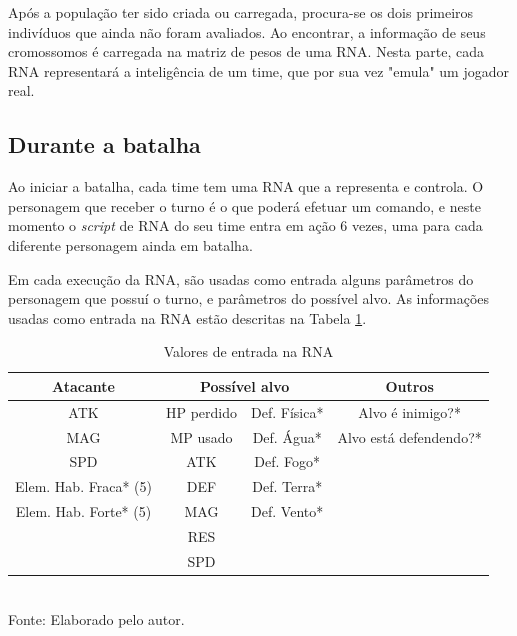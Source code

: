 \documentclass[
	12pt,					%
	openright,				%
	oneside,				%
	a4paper,				%
	bibjustif,				%
	chapter=TITLE,			%
	english,				%
	brazil,					%
	]{abntex2}
\newcommand{\source}[1]{\small Fonte: {#1}}
\begin{document}
	Após a população ter sido criada ou carregada,
	procura-se os dois primeiros indivíduos que ainda não foram avaliados.
	Ao encontrar, a informação de seus cromossomos é carregada na matriz de pesos de uma RNA.
	Nesta parte, cada RNA representará a inteligência de um time,
	que por sua vez "emula"{} um jogador real.
	
	\subsection{Durante a batalha}
	Ao iniciar a batalha, cada time tem uma RNA que a representa e controla.
	O personagem que receber o turno é o que poderá efetuar um comando,
	e neste momento o \textit{script} de RNA do seu time entra em ação 6 vezes,
	uma para cada diferente personagem ainda em batalha.
	
	Em cada execução da RNA, são usadas como entrada alguns parâmetros do personagem que possuí o turno,
	e parâmetros do possível alvo.
	As informações usadas como entrada na RNA estão descritas na Tabela \ref{tab:nnInput}.
	
	\begin{table}[h]
		\caption{Valores de entrada na RNA}
		\centering
		\small
		\renewcommand{\arraystretch}{1.2} %
		\begin{tabular}{c|c|c|c}
			\hline 
			\textbf{Atacante}			& \multicolumn{2}{c|}{\textbf{Possível alvo}}	& \textbf{Outros}		\\\hline
			ATK							& HP perdido		& Def. Física*		& Alvo é inimigo?*				\\ 
			MAG							& MP usado			& Def. Água*		& Alvo está defendendo?*		\\ 
			SPD							& ATK				& Def. Fogo*		& 								\\ 
			Elem. Hab. Fraca* (5)		& DEF				& Def. Terra*		& 								\\ 
			Elem. Hab. Forte* (5)		& MAG				& Def. Vento*		& 								\\ 
										& RES									& 								\\
										& SPD									& 								\\\hline
		\end{tabular}\\
		\vspace{3mm}
		\source{Elaborado pelo autor.}
		\label{tab:nnInput}
	\end{table}
	
\end{document}
